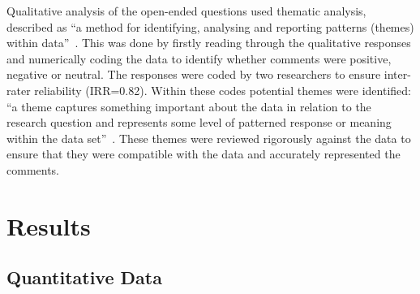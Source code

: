 \documentclass[conference]{IEEEtran}
\begin{document}

Qualitative analysis of the open-ended questions used thematic
analysis, described as ``a method for
identifying, analysing and reporting patterns (themes) within
data''~\cite{braun+clarke:2006}. This was done by firstly reading
through the qualitative responses and numerically coding the data to
identify whether comments were positive, negative or neutral. The
responses were coded by two researchers to ensure inter-rater
reliability (IRR=0.82). Within these codes potential themes were
identified: ``a theme captures something important about the data in
relation to the research question and represents some level of
patterned response or meaning within the data
set''~\cite{braun+clarke:2006}. These themes were reviewed
rigorously against the data to ensure that they were compatible with
the data and accurately represented the comments.


\section{Results}\label{results}

\subsection{Quantitative Data}\label{quantdata}

\end{document}
